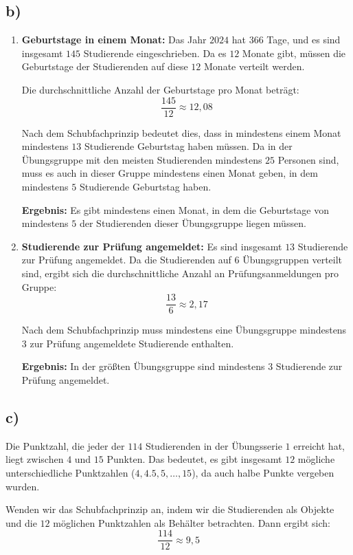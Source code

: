 \documentclass[a4paper]{scrartcl}
\begin{document}
\subsection*{b)}
\begin{enumerate}
  \item \textbf{Geburtstage in einem Monat:} Das Jahr \(2024\) hat \(366\) Tage, und es sind insgesamt \(145\) Studierende eingeschrieben. Da es \(12\) Monate gibt, müssen die Geburtstage der Studierenden auf diese \(12\) Monate verteilt werden.

  Die durchschnittliche Anzahl der Geburtstage pro Monat beträgt:
  \[
  \frac{145}{12} \approx 12{,}08
  \]

  Nach dem Schubfachprinzip bedeutet dies, dass in mindestens einem Monat mindestens \(13\) Studierende Geburtstag haben müssen. Da in der Übungsgruppe mit den meisten Studierenden mindestens \(25\) Personen sind, muss es auch in dieser Gruppe mindestens einen Monat geben, in dem mindestens \(5\) Studierende Geburtstag haben.

  \textbf{Ergebnis:} Es gibt mindestens einen Monat, in dem die Geburtstage von mindestens \(5\) der Studierenden dieser Übungsgruppe liegen müssen.
  
  \item \textbf{Studierende zur Prüfung angemeldet:} Es sind insgesamt \(13\) Studierende zur Prüfung angemeldet. Da die Studierenden auf \(6\) Übungsgruppen verteilt sind, ergibt sich die durchschnittliche Anzahl an Prüfungsanmeldungen pro Gruppe:
  \[
  \frac{13}{6} \approx 2{,}17
  \]

  Nach dem Schubfachprinzip muss mindestens eine Übungsgruppe mindestens \(3\) zur Prüfung angemeldete Studierende enthalten.

  \textbf{Ergebnis:} In der größten Übungsgruppe sind mindestens \(3\) Studierende zur Prüfung angemeldet.
\end{enumerate}
\subsection*{c)}
Die Punktzahl, die jeder der \(114\) Studierenden in der Übungsserie \(1\) erreicht hat, liegt zwischen \(4\) und \(15\) Punkten. Das bedeutet, es gibt insgesamt \(12\) mögliche unterschiedliche Punktzahlen (\(4, 4.5, 5, \dots, 15\)), da auch halbe Punkte vergeben wurden.

Wenden wir das Schubfachprinzip an, indem wir die Studierenden als Objekte und die \(12\) möglichen Punktzahlen als Behälter betrachten. Dann ergibt sich:
\[
\frac{114}{12} \approx 9{,}5
\]
\end{document}
